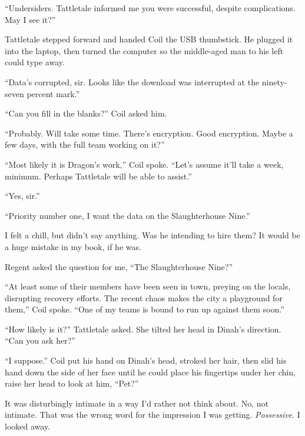 ``Undersiders.  Tattletale informed me you were successful, despite complications.  May I see it?''



Tattletale stepped forward and handed Coil the USB thumbstick.  He plugged it into the laptop, then turned the computer so the middle-aged man to his left could type away.



``Data's corrupted, sir.  Looks like the download was interrupted at the ninety-seven percent mark.''



``Can you fill in the blanks?'' Coil asked him.



``Probably.  Will take some time.  There's encryption.  Good encryption.  Maybe a few days, with the full team working on it?''



``Most likely it is Dragon's work,'' Coil spoke. ``Let's assume it'll take a week, minimum.  Perhaps Tattletale will be able to assist.''



``Yes, sir.''



``Priority number one, I want the data on the Slaughterhouse Nine.''



I felt a chill, but didn't say anything.  Was he intending to hire them?  It would be a huge mistake in my book, if he was.



Regent asked the question for me, ``The Slaughterhouse Nine?''



``At least some of their members have been seen in town, preying on the locals, disrupting recovery efforts.  The recent chaos makes the city a playground for them,'' Coil spoke.  ``One of my teams is bound to run up against them soon.''



``How likely is it?'' Tattletale asked.  She tilted her head in Dinah's direction.  ``Can you ask her?''



``I suppose.''  Coil put his hand on Dinah's head, stroked her hair, then slid his hand down the side of her face until he could place his fingertips under her chin, raise her head to look at him, ``Pet?''



It was disturbingly intimate in a way I'd rather not think about.  No, not intimate.  That was the wrong word for the impression I was getting.  \emph{Possessive}.  I looked away.



